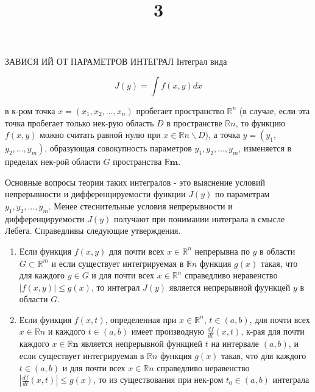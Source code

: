 \documentclass[10pt]{article}
\title{3 }
\author{}
\date{}
\begin{document}
\maketitle

ЗАВИСЯ ИЙ ОТ ПАРАМЕТРОВ ИНТЕГРАЛ Інтеграл вида



\[

J(y)=\int f(x, y) d x

\]



в к-ром точка $x=\left(x_{1}, x_{2}, \ldots, x_{n}\right)$ пробегает пространство $\mathbb{R}^{n}$ (в случае, если эта точка пробегает только нек-рую область $D$ в пространстве $\mathbb{R} n$, то функцию $f(x, y)$ можно считать равной нулю при $x \in \mathbb{R} n \backslash D)$, а точка $y=\left(y_{1}\right.$, $\left.y_{2}, \ldots, y_{m}\right)$, образующая совокупность параметров $y_{1}, y_{2}, \ldots, y_{m}$, изменяется в пределах нек-рой области $G$ пространства $\mathbb{R} \boldsymbol{m}$.



Основные вопросы теории таких интегралов - это выяснение условий непрерывности и дифференцируемости функции $J(y)$ по параметрам $y_{1}, y_{2}, \ldots, y_{m}$. Менее стеснительные условия непрерывности и дифференцируемости $J(y)$ получают при понимании интеграла в смысле Лебега. Справедливы следующие утверждения.



\begin{enumerate}

  \item Если функция $f(x, y)$ для почти всех $x \in \mathbb{R}^{n}$ непрерывна по $y$ в области $G \subset \mathbb{R}^{m}$ и если существует интегрируемая в $\mathbb{R} n$ функция $g(x)$ такая, что для каждого $y \in G$ и для почти всех $x \in \mathbb{R}^{n}$ справедливо неравенство $|f(x, y)| \leqslant g(x)$, то интеграл $J(y)$ является непрерывной фуункцей $y$ в области $G$.



  \item Если функция $f(x, t)$, определенная при $x \in \mathbb{R}^{n}$, $t \in(a, b)$, для почти всех $x \in \mathbb{R} n$ и каждого $t \in(a, b)$ имеет производную $\frac{d f}{d t}(x, t)$, к-рая для почти каждого $x \in \mathbb{R} \boldsymbol{n}$ является непрерывной функцией $t$ на интервале $(a, b)$, и если существует интегрируемая в $\mathbb{R} n$ функция $g(x)$ такая, что для каждого $t \in(a, b)$ и для почти всех $x \in \mathbb{R} n$ справедливо неравенство $\left|\frac{d f}{d t}(x, t)\right| \leqslant g(x)$, то из существования при нек-ром $t_{0} \in(a, b)$ интеграла



\end{enumerate}
\end{document}
